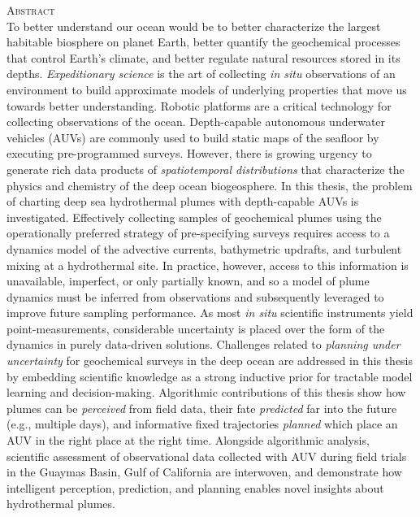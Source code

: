     \begin{singlespace}
    {\parindent0pt 
        {\large \textsc{Abstract}} \\ %

       To better understand our ocean would be to better characterize the largest habitable biosphere on planet Earth, better quantify the geochemical processes that control Earth's climate, and better regulate natural resources stored in its depths. \emph{Expeditionary science} is the art of collecting \emph{in situ} observations of an environment to build approximate models of underlying properties that move us towards better understanding. Robotic platforms are a critical technology for collecting observations of the ocean. Depth-capable autonomous underwater vehicles (AUVs) are commonly used to build static maps of the seafloor by executing pre-programmed surveys. However, there is growing urgency to generate rich data products of \emph{spatiotemporal distributions} that characterize the physics and chemistry of the deep ocean biogeosphere. In this thesis, the problem of charting deep sea hydrothermal plumes with depth-capable AUVs is investigated. Effectively collecting samples of geochemical plumes using the operationally preferred strategy of pre-specifying surveys requires access to a dynamics model of the advective currents, bathymetric updrafts, and turbulent mixing at a hydrothermal site. In practice, however, access to this information is unavailable, imperfect, or only partially known, and so a model of plume dynamics must be inferred from observations and subsequently leveraged to improve future sampling performance. As most \emph{in situ} scientific instruments yield point-measurements, considerable uncertainty is placed over the form of the dynamics in purely data-driven solutions. Challenges related to \emph{planning under uncertainty} for geochemical surveys in the deep ocean are addressed in this thesis by embedding scientific knowledge as a strong inductive prior for tractable model learning and decision-making. Algorithmic contributions of this thesis show how plumes can be \emph{perceived} from field data, their fate \emph{predicted} far into the future (e.g., multiple days), and informative fixed trajectories \emph{planned} which place an AUV in the right place at the right time. Alongside algorithmic analysis, scientific assessment of observational data collected with AUV \Sentry during field trials in the Guaymas Basin, Gulf of California are interwoven, and demonstrate how intelligent perception, prediction, and planning enables novel insights about hydrothermal plumes.\\ 
       
}
\end{singlespace}
